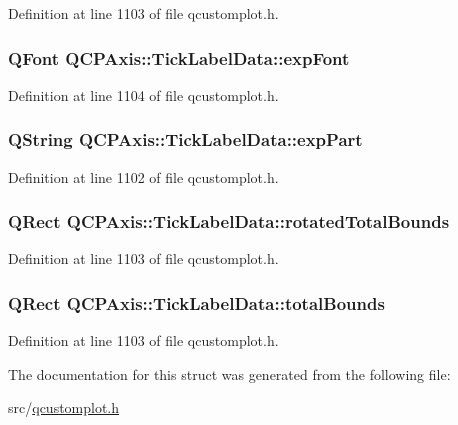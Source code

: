 Definition at line 1103 of file qcustomplot.\-h.

\hypertarget{struct_q_c_p_axis_1_1_tick_label_data_ac27f21cae93669402bf7cc2ef1f3b7a1}{
\subsubsection[{exp\-Font}]{\setlength{\rightskip}{0pt plus 5cm}Q\-Font Q\-C\-P\-Axis\-::\-Tick\-Label\-Data\-::exp\-Font}}\label{struct_q_c_p_axis_1_1_tick_label_data_ac27f21cae93669402bf7cc2ef1f3b7a1}


Definition at line 1104 of file qcustomplot.\-h.

\hypertarget{struct_q_c_p_axis_1_1_tick_label_data_aa6dc7fb45b835a5fdd04ae28fc5e636f}{
\subsubsection[{exp\-Part}]{\setlength{\rightskip}{0pt plus 5cm}Q\-String Q\-C\-P\-Axis\-::\-Tick\-Label\-Data\-::exp\-Part}}\label{struct_q_c_p_axis_1_1_tick_label_data_aa6dc7fb45b835a5fdd04ae28fc5e636f}


Definition at line 1102 of file qcustomplot.\-h.

\hypertarget{struct_q_c_p_axis_1_1_tick_label_data_afcbc12845c7806eda1738b5380cfa24e}{
\subsubsection[{rotated\-Total\-Bounds}]{\setlength{\rightskip}{0pt plus 5cm}Q\-Rect Q\-C\-P\-Axis\-::\-Tick\-Label\-Data\-::rotated\-Total\-Bounds}}\label{struct_q_c_p_axis_1_1_tick_label_data_afcbc12845c7806eda1738b5380cfa24e}


Definition at line 1103 of file qcustomplot.\-h.

\hypertarget{struct_q_c_p_axis_1_1_tick_label_data_a841fb63477661c658c14119602437670}{
\subsubsection[{total\-Bounds}]{\setlength{\rightskip}{0pt plus 5cm}Q\-Rect Q\-C\-P\-Axis\-::\-Tick\-Label\-Data\-::total\-Bounds}}\label{struct_q_c_p_axis_1_1_tick_label_data_a841fb63477661c658c14119602437670}


Definition at line 1103 of file qcustomplot.\-h.



The documentation for this struct was generated from the following file\-:\begin{DoxyCompactItemize}
\item 
src/\hyperlink{qcustomplot_8h}{qcustomplot.\-h}\end{DoxyCompactItemize}
